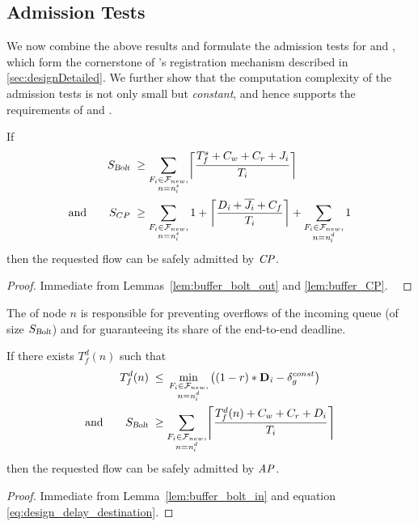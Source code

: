 \subsection{Admission Tests}
\label{subsec:admission}

We now combine the above results and formulate the admission tests for \CPs and \APs, which form the cornerstone of \DRP's registration mechanism described in \cref{sec:designDetailed}.
We further show that the computation complexity of the admission tests is not only small but \emph{constant}, and hence supports the requirements of  and .

\squarepar{%
  Let $F_j$ be the flow for which a request has been issued, and $\mathcal{F}_{new} = \mathcal{F} \cup \{F_j\}$.
  The \cp of node $n$ is responsible for preventing overflows of its local memory (of size $S_{CP}$) and of the outgoing \bolt queue of node $n$ (of size $S_{\bolt}$).%
}

\begin{theorem}\label{thm:CP}
If
\begin{align*}
S_{\bolt} \;
	 & \geq \sum_{\substack{\flowi \in \mathcal{F}_{new}, \\ n = \flowsrci}}
	 	\ceil*{\frac{T_f^s + C_w + C_r + \jitteri}{T_i}} \\
\textup{and}\qquad
S_{CP} \;
 	& \geq
	\sum_{\substack{\flowi \in \mathcal{F}_{new}, \\ n = \flowsrci}}
		1 + \ceil*{\frac{\ndeadlinei + \overline{\jitteri} + C_f}{T_i}}
	+ \sum_{\substack{\flowi \in \mathcal{F}_{new}, \\ n = \flowdsti}}
		1
\end{align*}
then the requested flow \flowj can be safely admitted by $\mathit{CP}$.
\end{theorem}

\begin{proof}Immediate from Lemmas~\ref{lem:buffer_bolt_out} and \ref{lem:buffer_CP}. \
\end{proof}


The \ap of node $n$ is responsible for preventing overflows of the incoming \bolt queue (of size $S_{\bolt}$) and for guaranteeing its share of the end-to-end deadline.

\begin{theorem}
\label{thm:AP}
  If there exists $T_f^d(n)$ such that
  \begin{align*}
    T_f^d(n) \;
    & \leq \, \min_{\substack{F_i\in \mathcal{F}_{new}, \\  n = \flowdsti}}
    \left( (1-r)*\deadlinei - \delta_g^{const} \right)\\
\textup{and}\qquad
    S_{\bolt} \;
    & \geq \sum_{\substack{\flowi \in \mathcal{F}_{new}, \\ n = \flowdsti}} \ceil*{\frac{T_f^d(n) + C_w + C_r + D_i}{T_i}}
  \end{align*}
  then the requested flow \flowj can be safely admitted by $\mathit{AP}$.
\end{theorem}
\begin{proof}
Immediate from Lemma~\ref{lem:buffer_bolt_in} and equation \eqref{eq:design_delay_destination}.
\end{proof}

